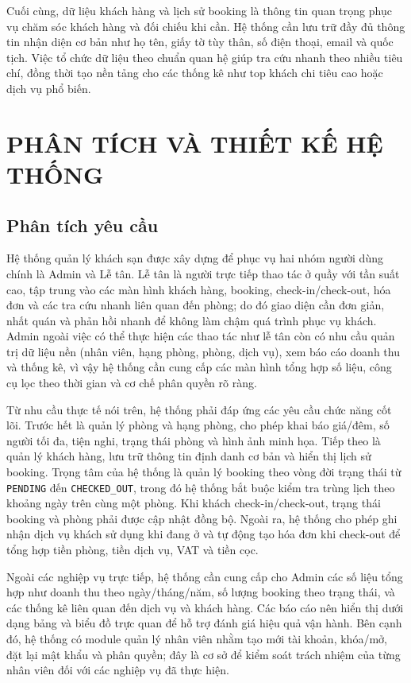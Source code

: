 \documentclass[13pt,a4paper]{extreport}
\begin{document}
Cuối cùng, dữ liệu khách hàng và lịch sử booking là thông tin quan trọng phục vụ chăm sóc khách hàng và đối chiếu khi cần. Hệ thống cần lưu trữ đầy đủ thông tin nhận diện cơ bản như họ tên, giấy tờ tùy thân, số điện thoại, email và quốc tịch. Việc tổ chức dữ liệu theo chuẩn quan hệ giúp tra cứu nhanh theo nhiều tiêu chí, đồng thời tạo nền tảng cho các thống kê như top khách chi tiêu cao hoặc dịch vụ phổ biến.

\chapter{PHÂN TÍCH VÀ THIẾT KẾ HỆ THỐNG}

\section{Phân tích yêu cầu}

Hệ thống quản lý khách sạn được xây dựng để phục vụ hai nhóm người dùng chính là Admin và Lễ tân. Lễ tân là người trực tiếp thao tác ở quầy với tần suất cao, tập trung vào các màn hình khách hàng, booking, check-in/check-out, hóa đơn và các tra cứu nhanh liên quan đến phòng; do đó giao diện cần đơn giản, nhất quán và phản hồi nhanh để không làm chậm quá trình phục vụ khách. Admin ngoài việc có thể thực hiện các thao tác như lễ tân còn có nhu cầu quản trị dữ liệu nền (nhân viên, hạng phòng, phòng, dịch vụ), xem báo cáo doanh thu và thống kê, vì vậy hệ thống cần cung cấp các màn hình tổng hợp số liệu, công cụ lọc theo thời gian và cơ chế phân quyền rõ ràng.

Từ nhu cầu thực tế nói trên, hệ thống phải đáp ứng các yêu cầu chức năng cốt lõi. Trước hết là quản lý phòng và hạng phòng, cho phép khai báo giá/đêm, số người tối đa, tiện nghi, trạng thái phòng và hình ảnh minh họa. Tiếp theo là quản lý khách hàng, lưu trữ thông tin định danh cơ bản và hiển thị lịch sử booking. Trọng tâm của hệ thống là quản lý booking theo vòng đời trạng thái từ \texttt{PENDING} đến \texttt{CHECKED\_OUT}, trong đó hệ thống bắt buộc kiểm tra trùng lịch theo khoảng ngày trên cùng một phòng. Khi khách check-in/check-out, trạng thái booking và phòng phải được cập nhật đồng bộ. Ngoài ra, hệ thống cho phép ghi nhận dịch vụ khách sử dụng khi đang ở và tự động tạo hóa đơn khi check-out để tổng hợp tiền phòng, tiền dịch vụ, VAT và tiền cọc.

Ngoài các nghiệp vụ trực tiếp, hệ thống cần cung cấp cho Admin các số liệu tổng hợp như doanh thu theo ngày/tháng/năm, số lượng booking theo trạng thái, và các thống kê liên quan đến dịch vụ và khách hàng. Các báo cáo nên hiển thị dưới dạng bảng và biểu đồ trực quan để hỗ trợ đánh giá hiệu quả vận hành. Bên cạnh đó, hệ thống có module quản lý nhân viên nhằm tạo mới tài khoản, khóa/mở, đặt lại mật khẩu và phân quyền; đây là cơ sở để kiểm soát trách nhiệm của từng nhân viên đối với các nghiệp vụ đã thực hiện.
\end{document}
